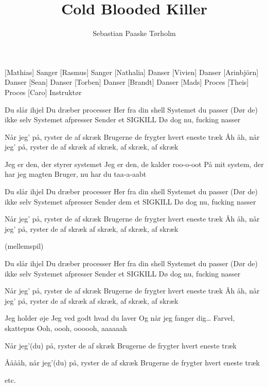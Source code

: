 \documentclass[a4paper,11pt]{article}
\title{Cold Blooded Killer}
\author{Sebastian Paaske Tørholm}
\begin{document}
\maketitle

\begin{roles}
[Mathias] Sanger
[Rasmus] Sanger
[Nathalia] Danser
[Vivien] Danser
[Arinbjörn] Danser
[Sean] Danser
[Torben] Danser
[Brandt] Danser
[Mads] Proces
[Theis] Proces
[Caro] Instruktør
\end{roles}

\begin{song}
%
Du slår ihjel
Du dræber processer
Her fra din shell
Systemet du passer
(Dør de) ikke selv
Systemet afpresser
Sender et SIGKILL
Dø dog nu, fucking nasser

Når jeg’ på, ryster de af skræk
Brugerne de frygter
hvert eneste træk
Åh åh, når jeg’ på, ryster de af skræk
af skræk, af skræk, af skræk

Jeg er den, der styrer systemet
Jeg er den, de kalder roo-o-oot
På mit system, der har jeg magten
Bruger, nu har du taa-a-aabt

Du slår ihjel
Du dræber processer
Her fra din shell
Systemet du passer
(Dør de) ikke selv
Systemet afpresser
Sender dem et SIGKILL
Dø dog nu, fucking nasser

Når jeg’ på, ryster de af skræk
Brugerne de frygter
hvert eneste træk
Åh åh, når jeg’ på, ryster de af skræk
af skræk, af skræk, af skræk

(mellemspil)

Du slår ihjel
Du dræber processer
Her fra din shell
Systemet du passer
(Dør de) ikke selv
Systemet afpresser
Sender et SIGKILL
Dø dog nu, fucking nasser

Når jeg’ på, ryster de af skræk
Brugerne de frygter
hvert eneste træk
Åh åh, når jeg’ på, ryster de af skræk
af skræk, af skræk, af skræk

Jeg holder øje
Jeg ved godt hvad du laver
Og når jeg fanger dig\ldots
Farvel, skattepus 
Ooh, oooh, oooooh, aaaaaah

Når jeg’(du) på, ryster de af skræk
Brugerne de frygter
hvert eneste træk

Ååååh, når jeg’(du) på, ryster de af skræk
Brugerne de frygter
hvert eneste træk

etc.

\end{song}
\end{document}
